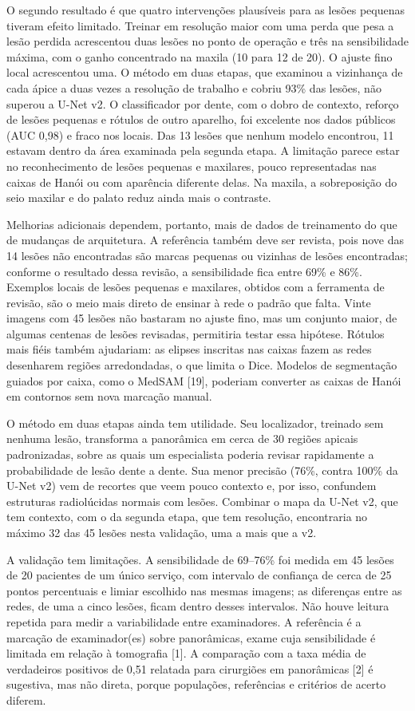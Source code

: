 \documentclass[twocolumn]{article}
\begin{document}
O segundo resultado é que quatro intervenções plausíveis para as lesões pequenas tiveram efeito limitado. Treinar em resolução maior com uma perda que pesa a lesão perdida acrescentou duas lesões no ponto de operação e três na sensibilidade máxima, com o ganho concentrado na maxila (10 para 12 de 20). O ajuste fino local acrescentou uma. O método em duas etapas, que examinou a vizinhança de cada ápice a duas vezes a resolução de trabalho e cobriu 93\% das lesões, não superou a U-Net v2. O classificador por dente, com o dobro de contexto, reforço de lesões pequenas e rótulos de outro aparelho, foi excelente nos dados públicos (AUC 0,98) e fraco nos locais. Das 13 lesões que nenhum modelo encontrou, 11 estavam dentro da área examinada pela segunda etapa. A limitação parece estar no reconhecimento de lesões pequenas e maxilares, pouco representadas nas caixas de Hanói ou com aparência diferente delas. Na maxila, a sobreposição do seio maxilar e do palato reduz ainda mais o contraste.

Melhorias adicionais dependem, portanto, mais de dados de treinamento do que de mudanças de arquitetura. A referência também deve ser revista, pois nove das 14 lesões não encontradas são marcas pequenas ou vizinhas de lesões encontradas; conforme o resultado dessa revisão, a sensibilidade fica entre 69\% e 86\%. Exemplos locais de lesões pequenas e maxilares, obtidos com a ferramenta de revisão, são o meio mais direto de ensinar à rede o padrão que falta. Vinte imagens com 45 lesões não bastaram no ajuste fino, mas um conjunto maior, de algumas centenas de lesões revisadas, permitiria testar essa hipótese. Rótulos mais fiéis também ajudariam: as elipses inscritas nas caixas fazem as redes desenharem regiões arredondadas, o que limita o Dice. Modelos de segmentação guiados por caixa, como o MedSAM [19], poderiam converter as caixas de Hanói em contornos sem nova marcação manual.

O método em duas etapas ainda tem utilidade. Seu localizador, treinado sem nenhuma lesão, transforma a panorâmica em cerca de 30 regiões apicais padronizadas, sobre as quais um especialista poderia revisar rapidamente a probabilidade de lesão dente a dente. Sua menor precisão (76\%, contra 100\% da U-Net v2) vem de recortes que veem pouco contexto e, por isso, confundem estruturas radiolúcidas normais com lesões. Combinar o mapa da U-Net v2, que tem contexto, com o da segunda etapa, que tem resolução, encontraria no máximo 32 das 45 lesões nesta validação, uma a mais que a v2.

A validação tem limitações. A sensibilidade de 69--76\% foi medida em 45 lesões de 20 pacientes de um único serviço, com intervalo de confiança de cerca de 25 pontos percentuais e limiar escolhido nas mesmas imagens; as diferenças entre as redes, de uma a cinco lesões, ficam dentro desses intervalos. Não houve leitura repetida para medir a variabilidade entre examinadores. A referência é a marcação de examinador(es) sobre panorâmicas, exame cuja sensibilidade é limitada em relação à tomografia [1]. A comparação com a taxa média de verdadeiros positivos de 0,51 relatada para cirurgiões em panorâmicas [2] é sugestiva, mas não direta, porque populações, referências e critérios de acerto diferem.
\end{document}
